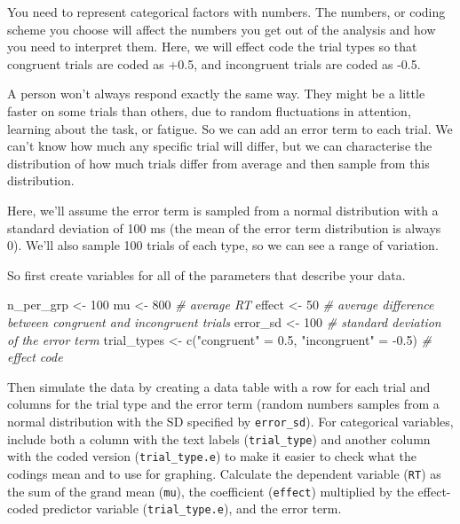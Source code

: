 \documentclass[
  oneside]{book}
\newenvironment{Shaded}{\begin{snugshade}}{\end{snugshade}}
\newcommand{\CommentTok}[1]{\textcolor[rgb]{0.56,0.35,0.01}{\textit{#1}}}
\newcommand{\DecValTok}[1]{\textcolor[rgb]{0.00,0.00,0.81}{#1}}
\newcommand{\FloatTok}[1]{\textcolor[rgb]{0.00,0.00,0.81}{#1}}
\newcommand{\FunctionTok}[1]{\textcolor[rgb]{0.00,0.00,0.00}{#1}}
\newcommand{\NormalTok}[1]{#1}
\newcommand{\OtherTok}[1]{\textcolor[rgb]{0.56,0.35,0.01}{#1}}
\newcommand{\SpecialCharTok}[1]{\textcolor[rgb]{0.00,0.00,0.00}{#1}}
\newcommand{\StringTok}[1]{\textcolor[rgb]{0.31,0.60,0.02}{#1}}
\begin{document}
You need to represent categorical factors with numbers. The numbers, or coding scheme you choose will affect the numbers you get out of the analysis and how you need to interpret them. Here, we will effect code the trial types so that congruent trials are coded as +0.5, and incongruent trials are coded as -0.5.

A person won't always respond exactly the same way. They might be a little faster on some trials than others, due to random fluctuations in attention, learning about the task, or fatigue. So we can add an error term to each trial. We can't know how much any specific trial will differ, but we can characterise the distribution of how much trials differ from average and then sample from this distribution.

Here, we'll assume the error term is sampled from a normal distribution with a standard deviation of 100 ms (the mean of the error term distribution is always 0). We'll also sample 100 trials of each type, so we can see a range of variation.

So first create variables for all of the parameters that describe your data.

\begin{Shaded}
\begin{Highlighting}[]
\NormalTok{n\_per\_grp }\OtherTok{\textless{}{-}} \DecValTok{100}
\NormalTok{mu }\OtherTok{\textless{}{-}} \DecValTok{800} \CommentTok{\# average RT}
\NormalTok{effect }\OtherTok{\textless{}{-}} \DecValTok{50} \CommentTok{\# average difference between congruent and incongruent trials}
\NormalTok{error\_sd }\OtherTok{\textless{}{-}} \DecValTok{100} \CommentTok{\# standard deviation of the error term}
\NormalTok{trial\_types }\OtherTok{\textless{}{-}} \FunctionTok{c}\NormalTok{(}\StringTok{"congruent"} \OtherTok{=} \FloatTok{0.5}\NormalTok{, }\StringTok{"incongruent"} \OtherTok{=} \SpecialCharTok{{-}}\FloatTok{0.5}\NormalTok{) }\CommentTok{\# effect code}
\end{Highlighting}
\end{Shaded}

Then simulate the data by creating a data table with a row for each trial and columns for the trial type and the error term (random numbers samples from a normal distribution with the SD specified by \texttt{error\_sd}). For categorical variables, include both a column with the text labels (\texttt{trial\_type}) and another column with the coded version (\texttt{trial\_type.e}) to make it easier to check what the codings mean and to use for graphing. Calculate the dependent variable (\texttt{RT}) as the sum of the grand mean (\texttt{mu}), the coefficient (\texttt{effect}) multiplied by the effect-coded predictor variable (\texttt{trial\_type.e}), and the error term.
\end{document}

